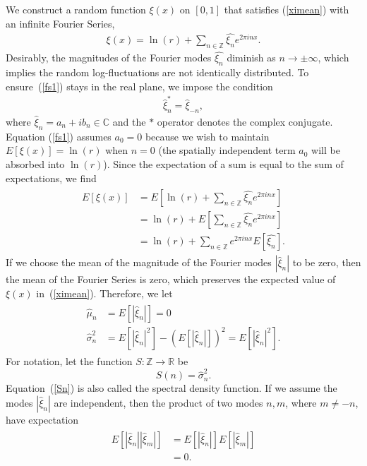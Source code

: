 We construct a random function $\xi(x)$ on $[0,1]$ that satisfies
(\ref{ximean}) with an infinite Fourier Series,
\begin{align}\label{fs1}
\xi(x) = \ln(r) + \sum_{n \in \mathbb{Z}}\hat{\xi_n}e^{2\pi inx}.
\end{align}
Desirably, the magnitudes of the Fourier modes $\hat{\xi_n}$ diminish
as $n \to \pm \infty$, which implies the random log-fluctuations are
not identically distributed. To ensure~(\ref{fs1}) stays in the real plane, we impose the condition
\begin{align}\label{realcond}
\hat{\xi}_{n}^* = \hat{\xi}_{-n},
\end{align}
where $\hat{\xi}_n=a_n + ib_n \in \mathbb{C}$ and the $*$ operator denotes the complex conjugate. Equation (\ref{fs1}) assumes $a_0=0$
because we wish to maintain $E[\xi(x)]=\ln(r)$ when $n=0$ (the
spatially independent term $a_0$ will be absorbed into $\ln(r)$).
Since the expectation of a sum is equal to the sum of
expectations, we find~\cite{ross}
\begin{align*}
\begin{split}
E[\xi(x)] &= E[\ln(r) + \sum_{n \in \mathbb{Z}}\hat{\xi_n}e^{2\pi
  inx}]\\
&= \ln(r) + E[\sum_{n \in \mathbb{Z}}\hat{\xi_n}e^{2\pi inx}]\\
&= \ln(r) + \sum_{n \in \mathbb{Z}}e^{2\pi inx}E[\hat{\xi_n}].
\end{split}
\end{align*}
If we choose the mean of the
magnitude of the Fourier modes $|\hat{\xi}_n|$ to be zero, then the mean of the Fourier
Series is zero, which preserves the expected value of $\xi(x)$ in~(\ref{ximean}). Therefore, we let
\begin{align}
\begin{split}\label{xihatmean}
\hat{\mu}_n&=E[|\hat{\xi}_n|]=0\\
\hat{\sigma}_n^2&=E[|\hat{\xi}_n|^2]-(E[|\hat{\xi}_n|])^2=E[|\hat{\xi}_n|^2].
\end{split}
\end{align}
For notation, let the function $S:\mathbb{Z} \to \mathbb{R}$ be
\begin{equation}\label{Sn}
S(n) = \hat{\sigma}_n^2.
\end{equation}
Equation~(\ref{Sn}) is also called the spectral density function. If we
assume the modes $|\hat{\xi}_n|$ are independent, then the product of
two modes $n,m$, where $m \neq -n$, have expectation
\begin{align*}
\begin{split}
E[|\hat{\xi}_n||\hat{\xi}_m|]&=E[|\hat{\xi}_n|]E[|\hat{\xi}_m|]\\
&=0.
\end{split}
\end{align*}
